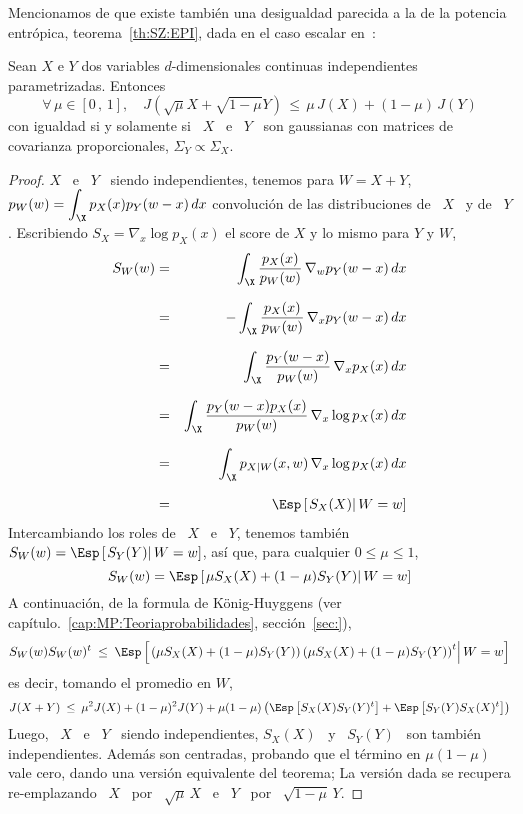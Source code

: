 Mencionamos de que existe tambi\'en una desigualdad parecida a la de la potencia
entr\'opica,  teorema~\ref{th:SZ:EPI}, dada en  el caso  escalar en~\cite{Joh04,
  Bla65, Zam98, DemCov91, KagYu08}:
%
\begin{teorema}
  Sean  $X$  e  $Y$  dos variables  $d$-dimensionales  continuas  independientes
  parametrizadas.  Entonces
  \[
  \forall \, \mu \in [0 \, ,  \, 1], \quad J\left( \sqrt{\mu} X + \sqrt{1-\mu} Y
  \right) \, \le \, \mu \, J(X) + (1-\mu) \, J(Y)
  \]
  con igualdad si y  solamente si \ $X$ \ e \ $Y$  \ son gaussianas con matrices
  de covarianza proporcionales, $\Sigma_Y \propto \Sigma_X$.
\end{teorema}
%
\begin{proof}
  $X$  \  e  \  $Y$  \  siendo  independientes,  tenemos  para  $W  =  X  +  Y$,
  $\displaystyle p_W(w)  = \int_\X p_X(x)  p_Y(w-x) \, dx$ convoluci\'on  de las
  distribuciones  de \  $X$ \  y de  \ $Y$.   Escribiendo $S_X  =  \nabla_x \log
  p_X(x)$ el score de $X$ y lo mismo para $Y$ y $W$,
  \begin{eqnarray*}
  S_W(w) & = & \int_\X \frac{p_X(x)}{p_W(w)} \, \nabla_w p_Y(w-x) \, dx\\[2.5mm]
  & = & - \int_\X \frac{p_X(x)}{p_W(w)} \, \nabla_x p_Y(w-x) \, dx\\[2.5mm]
  & = & \int_\X \frac{p_Y(w-x)}{p_W(w)} \, \nabla_x p_X(x) \, dx\\[2.5mm]
  & = & \int_\X \frac{p_Y(w-x) p_X(x)}{p_W(w)} \, \nabla_x \log p_X(x) \, dx\\[2.5mm]
  & = & \int_\X p_{X|W}(x,w) \, \nabla_x \log p_X(x) \, dx\\[2.5mm]
  & = & \Esp\left[ \left. S_X(X) \right| W = w \right]
  \end{eqnarray*}
  Intercambiando  los roles de  \ $X$  \ e  \ $Y$,  tenemos tambi\'en  $S_W(w) =
  \Esp\left[ \left. S_Y(Y) \right| W =  w \right]$, as\'i que, para cualquier $0
  \le \mu \le 1$,
  \[
  S_W(w) = \Esp\left[ \left. \mu S_X(X) + (1-\mu) S_Y(Y) \right| W = w \right]
  \]
  A    continuaci\'on,    de     la    formula    de    K\"onig-Huyggens    (ver
  cap\'itulo.~\ref{cap:MP:Teoriaprobabilidades}, secci\'on~\ref{sec:}),
  \[
  S_W(w) S_W(w)^t \: \le \:  \Esp\left[ \left. \left(\mu S_X(X) + (1-\mu) S_Y(Y)
      \right) \left(\mu S_X(X) + (1-\mu) S_Y(Y) \right)^t \right| W = w \right]
  \]
  es decir, tomando el promedio en $W$,
  \[
  J(X+Y) \: \le  \: \mu^2 J(X) + (1-\mu)^2 J(Y) +  \mu (1-\mu) \left( \Esp\left[
      S_X(X) S_Y(Y)^t \right] + \Esp\left[ S_Y(Y) S_X(X)^t \right] \right)
  \]
  Luego, \ $X$ \ e \ $Y$ \  siendo independientes, $S_X(X)$ \ y \ $S_Y(Y)$ \ son
  tambi\'en independientes. Adem\'as son centradas, probando que el t\'ermino en
  $\mu  (1-\mu)$ vale  cero, dando  una  versi\'on equivalente  del teorema;  La
  versi\'on dada se recupera re-emplazando \ $X$ \ por \ $\sqrt{\mu} \, X$ \ e \
  $Y$ \ por \ $\sqrt{1-\mu} \, Y$.


\end{proof}
